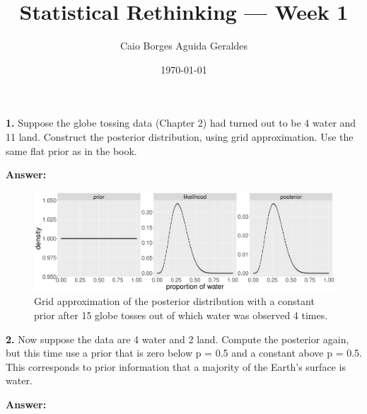 \documentclass[article]{memoir}
\author{Caio Borges Aguida Geraldes}
\title{Statistical Rethinking --- Week 1}
\date{\today}
\begin{document}
\maketitle

\noindent \textbf{1.} Suppose the globe tossing data (Chapter 2) had turned out to be 4 water
and 11 land. Construct the posterior distribution, using grid approximation.
Use the same flat prior as in the book.

\noindent \textbf{Answer:}



\begin{figure}[!ht]
\begin{center}
  \includegraphics[width=1\textwidth]{figs/ex01.png}
\end{center}
\caption{Grid approximation of the posterior distribution with a constant prior after 15 globe tosses out of which water was observed 4 times.}\label{fig:ex01}
\end{figure}

\noindent \textbf{2.} Now suppose the data are 4 water and 2 land. Compute the posterior
again, but this time use a prior that is zero below p = 0.5 and a constant
above p = 0.5. This corresponds to prior information that a majority of the
Earth’s surface is water.

\noindent \textbf{Answer:}


\end{document}
